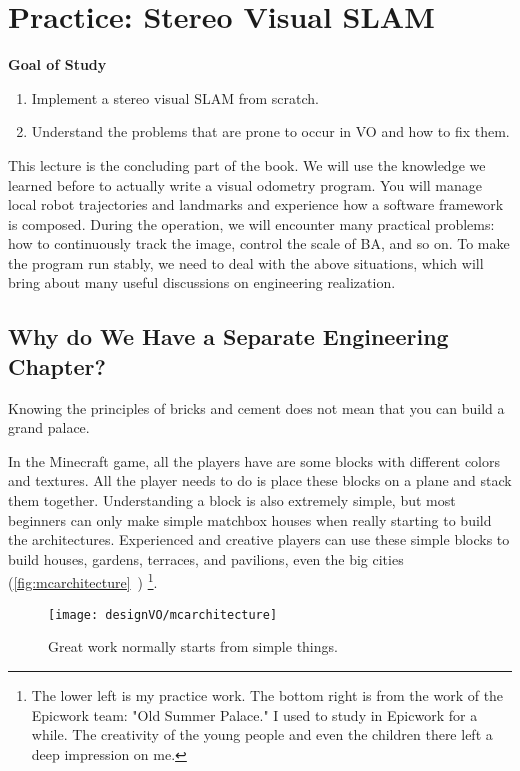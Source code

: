 \chapter{Practice: Stereo Visual SLAM}
\begin{mdframed}  
	\textbf{Goal of Study}
	\begin{enumerate}[labelindent=0em,leftmargin=1.5em]
	\item Implement a stereo visual SLAM from scratch.
	\item Understand the problems that are prone to occur in VO and how to fix them.
	\end{enumerate}
\end{mdframed}

This lecture is the concluding part of the book. We will use the knowledge we learned before to actually write a visual odometry program. You will manage local robot trajectories and landmarks and experience how a software framework is composed. During the operation, we will encounter many practical problems: how to continuously track the image, control the scale of BA, and so on. To make the program run stably, we need to deal with the above situations, which will bring about many useful discussions on engineering realization.

\newpage
\section{Why do We Have a Separate Engineering Chapter?}
Knowing the principles of bricks and cement does not mean that you can build a grand palace.

In the Minecraft game, all the players have are some blocks with different colors and textures. All the player needs to do is place these blocks on a plane and stack them together. Understanding a block is also extremely simple, but most beginners can only make simple matchbox houses when really starting to build the architectures. Experienced and creative players can use these simple blocks to build houses, gardens, terraces, and pavilions, even the big cities (\autoref{fig:mcarchitecture}~) \footnote{The lower left is my practice work. The bottom right is from the work of the Epicwork team: "Old Summer Palace." I used to study in Epicwork for a while. The creativity of the young people and even the children there left a deep impression on me. }.

\begin{figure}[!htp]
	\centering    
	\texttt{[image: designVO/mcarchitecture]}\\
	\caption{Great work normally starts from simple things.}
	\label{fig:mcarchitecture}
\end{figure}

